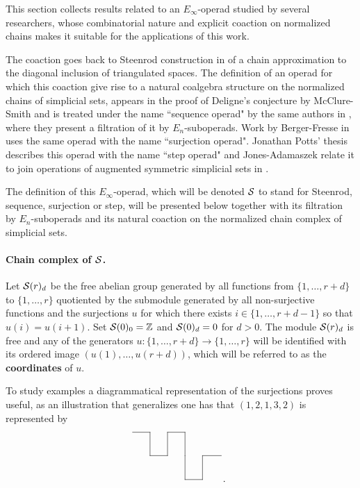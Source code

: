 \documentclass[thesis.tex]{subfiles}
\begin{document}
This section collects results related to an $E_\infty$-operad studied by several researchers, whose combinatorial nature and explicit coaction on normalized chains makes it suitable for the applications of this work.

The coaction goes back to Steenrod construction in \cite{Ste47} of a chain approximation to the diagonal inclusion of triangulated spaces. The definition of an operad for which this coaction give rise to a natural coalgebra structure on the normalized chains of simplicial sets, appears in the proof of Deligne's conjecture by McClure-Smith \cite{MS02} and is treated under the name ``sequence operad" by the same authors in \cite{MS03}, where they present a filtration of it by $E_n$-suboperads. Work by Berger-Fresse in \cite{BF04} uses the same operad with the name ``surjection operad". Jonathan Potts' thesis \cite{Pot06} describes this operad with the name ``step operad" and Jones-Adamaszek relate it to join operations of augmented symmetric simplicial sets in \cite{AJ11}.

The definition of this $E_\infty$-operad, which will be denoted $\S$ to stand for Steenrod, sequence, surjection or step, will be presented below together with its filtration by $E_n$-suboperads and its natural coaction on the normalized chain complex of simplicial sets.

\paragraph{Chain complex of $\S$.} Let $\S(r)_d$ be the free abelian group generated by all functions from $\{1,\dotsc,r+d\}$ to $\{1,\dotsc,r\}$ quotiented by the submodule generated by all non-surjective functions and the surjections $u$ for which there exists $i\in\{1,\dotsc,r+d-1\}$ so that $u(i)=u(i+1)$. Set $\S(0)_0=\Z$ and $\S(0)_d=0$ for $d>0$. The module $\S(r)_d$ is free and any of the generators $u:\{1,\dotsc,r+d\}\to\{1,\dotsc,r\}$ will be identified with its ordered image $(u(1),\dotsc,u(r+d))$, which will be referred to as the \textbf{coordinates} of $u$.

To study examples a diagrammatical representation of the surjections proves useful, as an illustration that generalizes one has that $(1,2,1,3,2)$ is represented by
$$\xymatrix@C=1.5pc@R=1.5pc{
\t \ar@{-}[r]& \t\ar@{-}[d] &\t \ar@{-}[r]&\t \ar@{-}[d]& \t &  \\
\t &\t \ar@{-}[r]&\t \ar@{-}[u]&\t \ar@{-}[d]&\t \ar@{-}[r]&  \\
\t &\t &\t &\t \ar@{-}[r]& \t\ar@{-}[u]& . }$$
\end{document}
